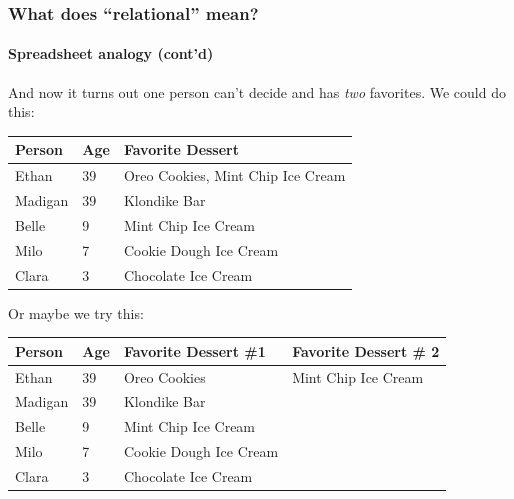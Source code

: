 \documentclass[aspectratio=169]{beamer}
\begin{document}
\begin{frame}
  \frametitle{What does ``relational'' mean?}
  \framesubtitle{Spreadsheet analogy (cont'd)}

  And now it turns out one person can't decide and has \emph{two} favorites.
  We could do this:

  \begin{table}[]
    \small
    \begin{tabular}{@{}lll@{}}
      \toprule
      Person  & Age & Favorite Dessert                  \\ \midrule
      Ethan   & 39  & Oreo Cookies, Mint Chip Ice Cream \\
      Madigan & 39  & Klondike Bar                      \\
      Belle   & 9   & Mint Chip Ice Cream               \\
      Milo    & 7   & Cookie Dough Ice Cream            \\
      Clara   & 3   & Chocolate Ice Cream               \\ \bottomrule
    \end{tabular}
  \end{table}

  Or maybe we try this:

  \begin{table}[]
    \small
    \begin{tabular}{@{}llll@{}}
      \toprule
      Person  & Age & Favorite Dessert \#1   & Favorite Dessert \# 2 \\ \midrule
      Ethan   & 39  & Oreo Cookies           & Mint Chip Ice Cream   \\
      Madigan & 39  & Klondike Bar           &                       \\
      Belle   & 9   & Mint Chip Ice Cream    &                       \\
      Milo    & 7   & Cookie Dough Ice Cream &                       \\
      Clara   & 3   & Chocolate Ice Cream    &                       \\ \bottomrule
    \end{tabular}
  \end{table}
\end{frame}
\end{document}

